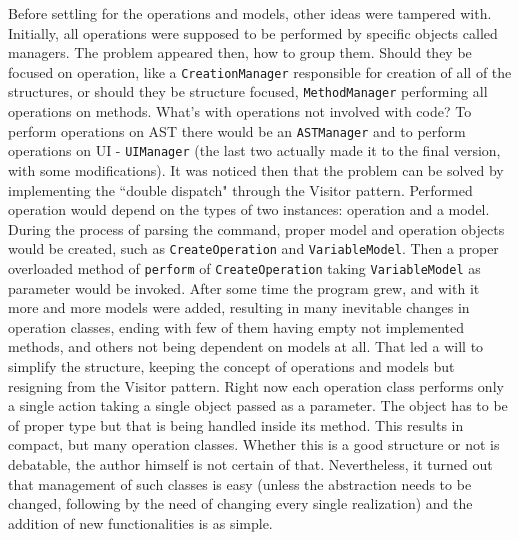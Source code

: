 Before settling for the operations and models, other ideas were tampered with. Initially, all operations were supposed to be performed by specific objects called managers. The problem appeared then, how to group them. Should they be focused on operation, like a \texttt{CreationManager} responsible for creation of all of the structures, or should they be structure focused, \eg \texttt{MethodManager} performing all operations on methods. What's with operations not involved with code? To perform operations on AST there would be an \texttt{ASTManager} and to perform operations on UI - \texttt{UIManager} (the last two actually made it to the final version, with some modifications). It was noticed then that the problem can be solved by implementing the ``double dispatch" through the Visitor pattern. Performed operation would depend on the types of two instances: operation and a model. During the process of parsing the command, proper model and operation objects would be created, such as \texttt{CreateOperation} and \texttt{VariableModel}. Then a proper overloaded method of \texttt{perform} of \texttt{CreateOperation} taking \texttt{VariableModel} as parameter would be invoked. After some time the program grew, and with it more and more models were added, resulting in many inevitable changes in operation classes, ending with few of them having empty not implemented methods, and others not being dependent on models at all. That led a will to simplify the structure, keeping the concept of operations and models but resigning from the Visitor pattern. Right now each operation class performs only a single action taking a single object passed as a parameter. The object has to be of proper type but that is being handled inside its method. This results in compact, but many operation classes. Whether this is a good structure or not is debatable, the author himself is not certain of that. Nevertheless, it turned out that management of such classes is easy (unless the abstraction needs to be changed, following by the need of changing every single realization) and the addition of new functionalities is as simple.

